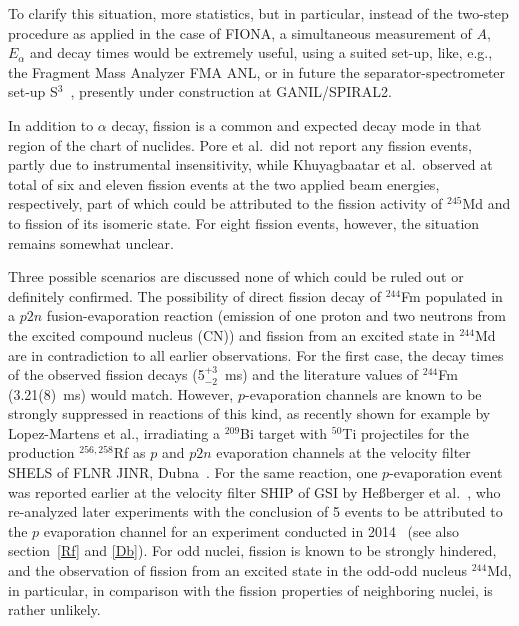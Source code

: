 To clarify this situation, more statistics, but in particular, instead of the two-step procedure as applied in the case of FIONA, a simultaneous measurement of $A$, $E_\alpha$ and decay times would be extremely useful, using a suited set-up, like, e.g., the Fragment Mass Analyzer FMA ANL, or in future the separator-spectrometer set-up S$^3$~\cite{Dechery2016}, presently under construction at GANIL/SPIRAL2.

In addition to $\alpha$ decay, fission is a common and expected decay mode in that region of the chart of nuclides. 
Pore et al.~did not report any fission events, partly due to instrumental insensitivity, while Khuyagbaatar et al.~observed at total of six and eleven fission events at the two applied beam energies, respectively, part of which could be attributed to the fission activity of $^{245}$Md and to fission of its isomeric state. 
For eight fission events, however, the situation remains somewhat unclear. 

Three possible scenarios are discussed none of which could be ruled out or definitely confirmed. 
The possibility of direct fission decay of $^{244}$Fm populated in a $p2n$ fusion-evaporation reaction (emission of one proton and two neutrons from the excited compound nucleus (CN)) and fission from an excited state in $^{244}$Md are in contradiction to all earlier observations. 
For the first case, the decay times of the observed fission decays (5$^{+3}_{-2}$~ms) and the literature values of $^{244}$Fm (3.21(8)~ms) would match. 
However, $p$-evaporation channels are known to be strongly suppressed in reactions of this kind, as recently shown for example by Lopez-Martens et al., irradiating a $^{209}$Bi target with $^{50}$Ti projectiles for the production $^{256,258}$Rf as $p$ and $p2n$ evaporation channels at the velocity filter SHELS of FLNR JINR, Dubna~\cite{Lopez-Martens2019}.
For the same reaction, one $p$-evaporation event was reported earlier at the velocity filter SHIP of GSI by He{\ss}berger et al.~\cite{Hessberger1985}, who re-analyzed later experiments with the conclusion of 5 events to be attributed to the $p$ evaporation channel for an experiment conducted in 2014~\cite{Hessberger2019} (see also section~\ref{Rf} and \ref{Db}).
For odd nuclei, fission is known to be strongly hindered, and the observation of fission from an excited state in the odd-odd nucleus $^{244}$Md, in particular, in comparison with the fission properties of neighboring nuclei, is rather unlikely. 

